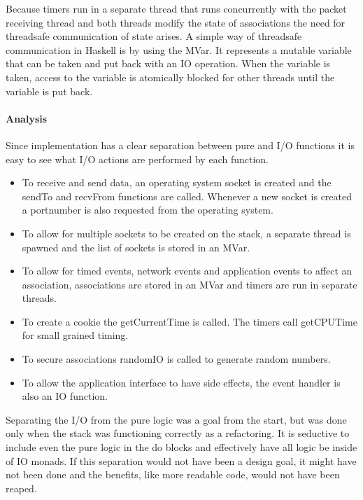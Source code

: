 Because timers run in a separate thread that runs concurrently with the packet receiving thread and both threads modify the state of associations the need for threadsafe communication of state arises. A simple way of threadsafe communication in Haskell is by using the MVar. It represents a mutable variable that can be taken and put back with an IO operation. When the variable is taken, access to the variable is atomically blocked for other threads until the variable is put back. 

\paragraph{Analysis}
Since implementation has a clear separation between pure and I/O functions it is easy to see what I/O actions are performed by each function. 

\begin{itemize}
\item To receive and send data, an operating system socket is created and the sendTo and recvFrom functions are called. Whenever a new socket is created a portnumber is also requested from the operating system.
\item To allow for multiple sockets to be created on the stack, a separate thread is spawned and the list of sockets is stored in an MVar.
\item To allow for timed events, network events and application events to affect an association, associations are stored in an MVar and timers are run in separate threads.
\item To create a cookie the getCurrentTime is called. The timers call getCPUTime for small grained timing.
\item To secure associations randomIO is called to generate random numbers.
\item To allow the application interface to have side effects, the event handler is also an IO function.
\end{itemize}


Separating the I/O from the pure logic was a goal from the start, but was done only when the stack was functioning correctly as a refactoring. It is seductive to include even the pure logic in the do blocks and effectively have all logic be inside of IO monads. If this separation would not have been a design goal, it might have not been done and the benefits, like more readable code,  would not have been reaped.

